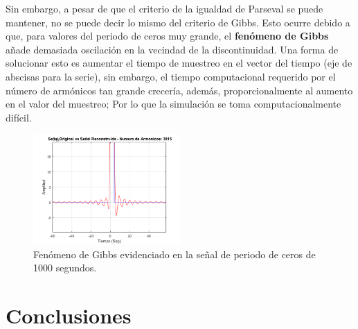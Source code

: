 \documentclass[7pt]{article}
\begin{document}
    Sin embargo, a pesar de que el criterio de la igualdad de Parseval se puede mantener, no 
    se puede decir lo mismo del criterio de Gibbs. Esto ocurre debido a que, para valores del 
    periodo de ceros muy grande, el \textbf{fenómeno de Gibbs} añade demasiada oscilación en la 
    vecindad de la discontinuidad. Una forma de solucionar esto es aumentar el tiempo de 
    muestreo en el vector del tiempo (eje de abscisas para la serie), sin embargo, el tiempo 
    computacional requerido por el número de armónicos tan grande crecería, además, 
    proporcionalmente al aumento en el valor del muestreo; Por lo que la simulación se toma 
    computacionalmente difícil.

    \begin{figure}[H]
        \centering
        \includegraphics[width=0.5\textwidth]{img/figure10.png}
        \caption{Fenómeno de Gibbs evidenciado en la señal de periodo de ceros de 1000 segundos.}
        \label{figure10}
    \end{figure}

\section*{Conclusiones}
    
\end{document}
